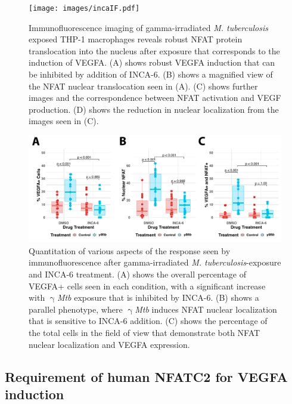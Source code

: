 \begin{figure}
\centering
\texttt{[image: images/incaIF.pdf]}
\caption[Immunofluorescence of $\upgamma$-\textit{Mtb}-exposed THP-1 macrophages]{Immunofluorescence imaging of gamma\hyp{}irradiated \textit{M. tuberculosis} exposed THP\hyp{}1 macrophages reveals robust NFAT protein translocation into the nucleus after exposure that corresponds to the induction of VEGFA. (A) shows robust VEGFA induction that can be inhibited by addition of INCA\hyp{}6. (B) shows a magnified view of the NFAT nuclear translocation seen in (A). (C) shows further images and the correspondence between NFAT activation and VEGF production. (D) shows the reduction in nuclear localization from the images seen in (C).}
\label{figure:incaif}

\end{figure}

\begin{figure}
\centering
\includegraphics[width=\textwidth]{images/incaIFquant.pdf}
\caption[Quantitation of THP-1 macrophage immunofluorescence with NFAT inhibition]{Quantitation of various aspects of the response seen by immunofluorescence after gamma\hyp{}irradiated \textit{M. tuberculosis}\hyp{}exposure and INCA\hyp{}6 treatment. (A) shows the overall percentage of VEGFA+ cells seen in each condition, with a significant increase with $\upgamma$\textit{Mtb} exposure that is inhibited by INCA\hyp{}6. (B) shows a parallel phenotype, where $\upgamma$\textit{Mtb} induces NFAT nuclear localization that is sensitive to INCA\hyp{}6 addition. (C) shows the percentage of the total cells in the field of view that demonstrate both NFAT nuclear localization and VEGFA expression.}
\label{figure:incaquant}
\end{figure}

\subsection{Requirement of human NFATC2 for VEGFA induction}\label{thp1lenti}

